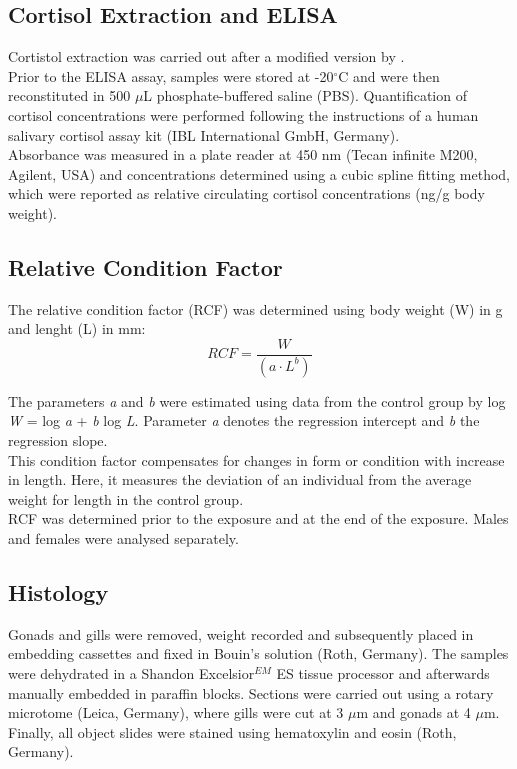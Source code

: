 \documentclass[twoside]{article}
\begin{document}
\begin{multicols}{2}
\subsection{Cortisol Extraction and ELISA}

Cortistol extraction was carried out after a modified version by \cite{canavello2011}. \\
Prior to the ELISA assay, samples  were stored at -20$^{\circ}$C and were then reconstituted in 500 ${\mu}$L phosphate-buffered saline (PBS). Quantification of cortisol concentrations were performed following the instructions of a human salivary cortisol assay kit (IBL International GmbH, Germany). \\
Absorbance was measured in a plate reader at 450 nm (Tecan infinite M200, Agilent, USA) and concentrations determined using a cubic spline fitting method, which were reported as relative circulating cortisol concentrations (ng/g body weight).  

\subsection{Relative Condition Factor}
The relative condition factor (RCF) was determined using body weight (W) in g and lenght (L) in mm:  
\begin{equation}
RCF = \frac{W}{(a\cdot L^{b})}
\end{equation}

The parameters \textit{a} and \textit{b} were estimated using data from the control group by log \textit{W} = log \textit{a} + \textit{b} log \textit{L}. Parameter \textit{a} denotes the regression intercept and \textit{b} the regression slope. \\ 
This condition factor compensates for changes in form or condition with increase in length. Here, it measures the deviation of an individual from the average weight for length in the control group. \\
RCF was determined prior to the exposure and at the end of the exposure. Males and females were analysed separately. 


\subsection{Histology}
Gonads and gills were removed, weight recorded and subsequently placed in embedding cassettes and fixed in Bouin's solution (Roth, Germany). The samples were dehydrated in a Shandon Excelsior$^{EM}$ ES tissue processor and afterwards manually embedded in paraffin blocks. 
Sections were carried out using a rotary microtome (Leica, Germany), where gills were cut at 3 $\mu$m and gonads at 4 $\mu$m.  Finally, all object slides were stained using hematoxylin and eosin (Roth, Germany).


\end{multicols}
\end{document}
